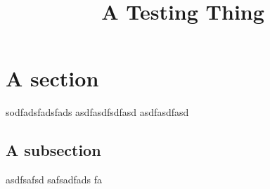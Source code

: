 \documentclass{article}
\title{A Testing Thing}
\begin{document}
\section{A section}
sodfadsfadsfads
asdfasdfsdfasd
asdfasdfasd
\subsection{A subsection}
asdfsafsd
safsadfads
fa
\end{document}
